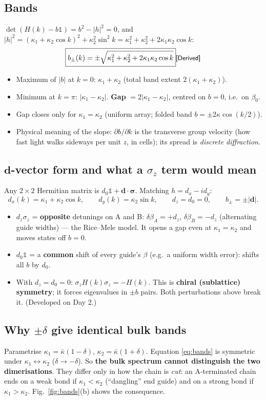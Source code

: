 \documentclass[10pt,a4paper]{article}
\newcommand{\kb}{\bar\kappa}
\newcommand{\ka}{\kappa_1}
\newcommand{\kc}{\kappa_2}
\newcommand{\evd}[1]{\textsf{\small[#1]}}
\begin{document}
\subsection{Bands}
$\det(H(k)-b\mathbb 1)=b^2-|h|^2=0$, and $|h|^2=(\ka+\kc\cos k)^2+\kc^2\sin^2k=\ka^2+\kc^2+2\ka\kc\cos k$:
\begin{equation}
\boxed{b_\pm(k)=\pm\sqrt{\ka^2+\kc^2+2\ka\kc\cos k}} \evd{Derived}\label{eq:bands}
\end{equation}
\begin{itemize}[itemsep=1pt]
\item Maximum of $|b|$ at $k=0$: $\ka+\kc$ (total band extent $2(\ka+\kc)$).
\item Minimum at $k=\pi$: $|\ka-\kc|$. \textbf{Gap} $=2|\ka-\kc|$, centred on $b=0$, i.e.\ on $\beta_0$.
\item Gap closes only for $\ka=\kc$ (uniform array; folded band $b=\pm2\kappa\cos(k/2)$).
\item Physical meaning of the slope: $\partial b/\partial k$ is the transverse group velocity (how fast light walks sideways per unit $z$, in cells); its spread is \emph{discrete diffraction}.
\end{itemize}

\subsection{\texorpdfstring{$\bm d$-vector form and what a $\sigma_z$ term would mean}{d-vector form and what a sigma-z term would mean}}
Any $2\times2$ Hermitian matrix is $d_0\mathbb 1+\bm d\cdot\bm\sigma$. Matching $h=d_x-id_y$:
\[
d_x(k)=\ka+\kc\cos k,\qquad d_y(k)=\kc\sin k,\qquad d_z=d_0=0,\qquad b_\pm=\pm|\bm d| .
\]
\begin{itemize}[itemsep=1pt]
\item $d_z\sigma_z$ = \textbf{opposite} detunings on A and B: $\delta\beta_A=+d_z$, $\delta\beta_B=-d_z$ (alternating guide widths) --- the Rice--Mele model. It opens a gap even at $\ka=\kc$ and moves states off $b=0$.
\item $d_0\mathbb 1$ = a \textbf{common} shift of every guide's $\beta$ (e.g.\ a uniform width error): shifts all $b$ by $d_0$.
\item With $d_z=d_0=0$: $\sigma_zH(k)\sigma_z=-H(k)$. This is \textbf{chiral (sublattice) symmetry}; it forces eigenvalues in $\pm b$ pairs. Both perturbations above break it. (Developed on Day 2.)
\end{itemize}

\subsection{\texorpdfstring{Why $\pm\delta$ give identical bulk bands}{Why +-delta give identical bulk bands}}
Parametrise $\ka=\kb(1-\delta)$, $\kc=\kb(1+\delta)$. Equation \eqref{eq:bands} is symmetric under $\ka\leftrightarrow\kc$ ($\delta\to-\delta$). So \textbf{the bulk spectrum cannot distinguish the two dimerisations}. They differ only in how the chain is \emph{cut}: an A-terminated chain ends on a weak bond if $\ka<\kc$ (``dangling'' end guide) and on a strong bond if $\ka>\kc$. Fig.~\ref{fig:bands}(b) shows the consequence.
\end{document}
